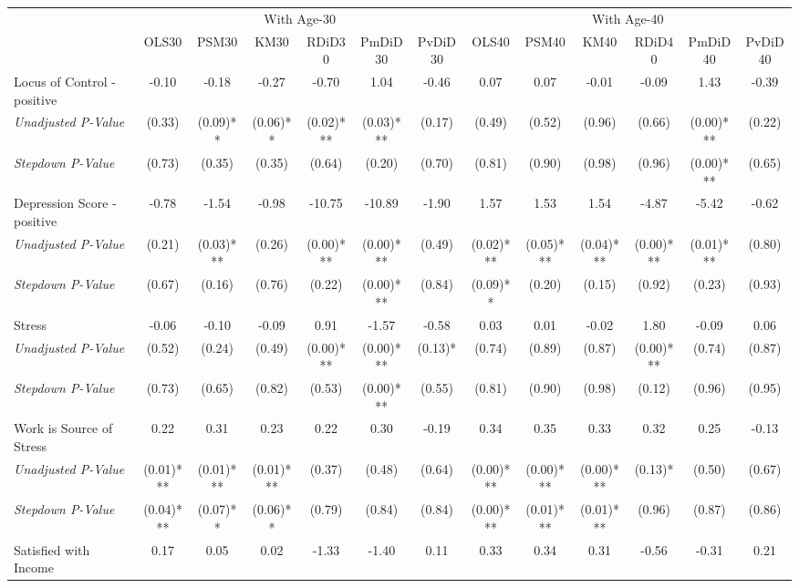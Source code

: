 \begin{tabular}{l c c c c c c c c c c c c}
\toprule
& \multicolumn{6}{c}{With Age-30} & \multicolumn{6}{c}{With Age-40} \\\cmidrule(lr){2-7} \cmidrule(lr){8-13}
 & OLS30 & PSM30 & KM30 & RDiD30 & PmDiD30 & PvDiD30 & OLS40 & PSM40 & KM40 & RDiD40 & PmDiD40 & PvDiD40 \\
\midrule
Locus of Control - positive & -0.10 & -0.18 & -0.27 & -0.70 & 1.04 & -0.46 & 0.07 & 0.07 & -0.01 & -0.09 & 1.43 & -0.39 \\
\quad \textit{Unadjusted P-Value} & (0.33) & (0.09)** & (0.06)** & (0.02)*** & (0.03)*** & (0.17) & (0.49) & (0.52) & (0.96) & (0.66) & (0.00)*** & (0.22) \\
\quad \textit{Stepdown P-Value} & (0.73) & (0.35) & (0.35) & (0.64) & (0.20) & (0.70) & (0.81) & (0.90) & (0.98) & (0.96) & (0.00)*** & (0.65) \\
Depression Score - positive & -0.78 & -1.54 & -0.98 & -10.75 & -10.89 & -1.90 & 1.57 & 1.53 & 1.54 & -4.87 & -5.42 & -0.62 \\
\quad \textit{Unadjusted P-Value} & (0.21) & (0.03)*** & (0.26) & (0.00)*** & (0.00)*** & (0.49) & (0.02)*** & (0.05)*** & (0.04)*** & (0.00)*** & (0.01)*** & (0.80) \\
\quad \textit{Stepdown P-Value} & (0.67) & (0.16) & (0.76) & (0.22) & (0.00)*** & (0.84) & (0.09)** & (0.20) & (0.15) & (0.92) & (0.23) & (0.93) \\
Stress & -0.06 & -0.10 & -0.09 & 0.91 & -1.57 & -0.58 & 0.03 & 0.01 & -0.02 & 1.80 & -0.09 & 0.06 \\
\quad \textit{Unadjusted P-Value} & (0.52) & (0.24) & (0.49) & (0.00)*** & (0.00)*** & (0.13)* & (0.74) & (0.89) & (0.87) & (0.00)*** & (0.74) & (0.87) \\
\quad \textit{Stepdown P-Value} & (0.73) & (0.65) & (0.82) & (0.53) & (0.00)*** & (0.55) & (0.81) & (0.90) & (0.98) & (0.12) & (0.96) & (0.95) \\
Work is Source of Stress & 0.22 & 0.31 & 0.23 & 0.22 & 0.30 & -0.19 & 0.34 & 0.35 & 0.33 & 0.32 & 0.25 & -0.13 \\
\quad \textit{Unadjusted P-Value} & (0.01)*** & (0.01)*** & (0.01)*** & (0.37) & (0.48) & (0.64) & (0.00)*** & (0.00)*** & (0.00)*** & (0.13)* & (0.50) & (0.67) \\
\quad \textit{Stepdown P-Value} & (0.04)*** & (0.07)** & (0.06)** & (0.79) & (0.84) & (0.84) & (0.00)*** & (0.01)*** & (0.01)*** & (0.96) & (0.87) & (0.86) \\
Satisfied with Income & 0.17 & 0.05 & 0.02 & -1.33 & -1.40 & 0.11 & 0.33 & 0.34 & 0.31 & -0.56 & -0.31 & 0.21 \\

\end{tabular}

